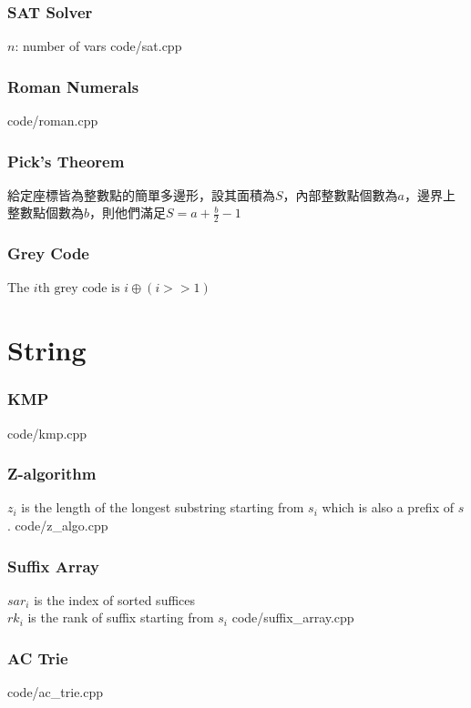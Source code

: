 \documentclass [landscape,8pt,a4paper,twocolumn]{article}
\begin{document}
\section{SAT Solver}
$ n $: number of vars
 {code/sat.cpp}

\section{Roman Numerals}
 {code/roman.cpp}

\section{Pick's Theorem}
給定座標皆為整數點的簡單多邊形，設其面積為$ S $，內部整數點個數為$ a $，邊界上整數點個數為$ b $，則他們滿足$ S=a+\frac{b}{2}-1 $

\section{Grey Code}
The $ i \text{th grey code is } i \oplus (i>>1) $

\newpage
\part{String}

\section{KMP}
 {code/kmp.cpp}

\section{Z-algorithm}
$ z_i $ is the length of the longest substring starting from $ s_i $ which is also a prefix of $ s $.
 {code/z_algo.cpp}

\section{Suffix Array}
$ sar_i $ is the index of sorted suffices \\
$ rk_i $ is the rank of suffix starting from $ s_i $
 {code/suffix_array.cpp}

\section{AC Trie}
 {code/ac_trie.cpp}
\end{document}
